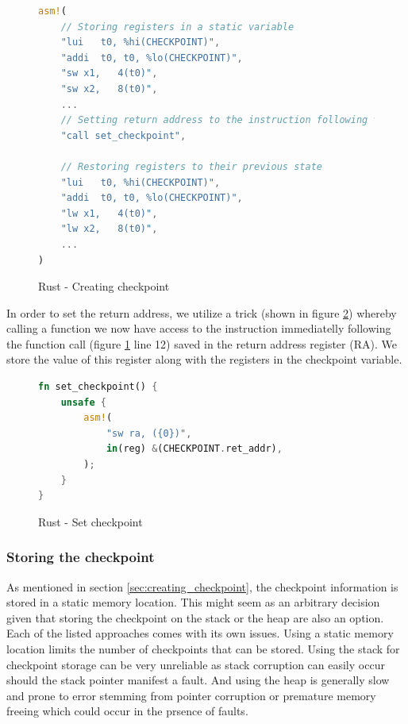 \documentclass[12pt, letterpaper]{article}
\begin{document}
\begin{figure}[!h]
\begin{lstlisting}[language=Rust]
asm!(
    // Storing registers in a static variable
    "lui   t0, %hi(CHECKPOINT)",
    "addi  t0, t0, %lo(CHECKPOINT)",
    "sw x1,   4(t0)",
    "sw x2,   8(t0)",
    ...
    // Setting return address to the instruction following this function call
    "call set_checkpoint",

    // Restoring registers to their previous state
    "lui   t0, %hi(CHECKPOINT)",
    "addi  t0, t0, %lo(CHECKPOINT)",
    "lw x1,   4(t0)",
    "lw x2,   8(t0)",
    ...
)
\end{lstlisting}
\caption{Rust - Creating checkpoint}
\label{fig:rust_create_checkpoint}
\end{figure}

In order to set the return address, we utilize a trick (shown in figure \ref{fig:rust_set_checkpoint}) whereby calling a function we now have access to the instruction immediatelly following the function call (figure \ref{fig:rust_create_checkpoint} line 12) saved in the return address register (RA). We store the value of this register along with the registers in the checkpoint variable.

\begin{figure}[!h]
\begin{lstlisting}[language=Rust]
fn set_checkpoint() {
    unsafe {
        asm!(
            "sw ra, ({0})",
            in(reg) &(CHECKPOINT.ret_addr),
        );
    }
}
\end{lstlisting}
\caption{Rust - Set checkpoint}
\label{fig:rust_set_checkpoint}
\end{figure}

\subsubsection{Storing the checkpoint}

As mentioned in section \ref{sec:creating_checkpoint}, the checkpoint information is stored in a static memory location. This might seem as an arbitrary decision given that storing the checkpoint on the stack or the heap are also an option. Each of the listed approaches comes with its own issues. Using a static memory location limits the number of checkpoints that can be stored. Using the stack for checkpoint storage can be very unreliable as stack corruption can easily occur should the stack pointer manifest a fault. And using the heap is generally slow and prone to error stemming from pointer corruption or premature memory freeing which could occur in the prsence of faults.
\end{document}
